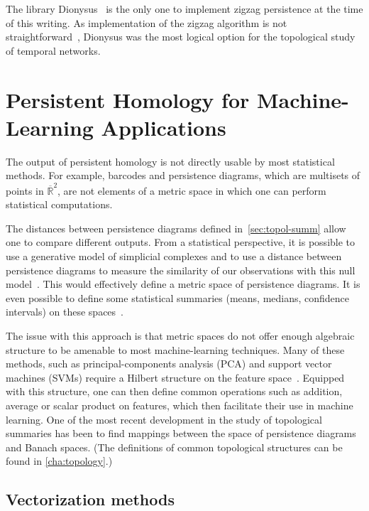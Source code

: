 \documentclass[a4paper,11pt,openany,extrafontsizes]{memoir}
\begin{document}
The library Dionysus~\cite{morozov_dionysus:_2018} is the only one to
implement zigzag persistence at the time of this writing. As
implementation of the zigzag algorithm is not
straightforward~\cite{carlsson_zigzag_2009, maria_computing_2016},
Dionysus was the most logical option for the topological study of
temporal networks.

\chapter{Persistent Homology for Machine-Learning Applications}%
\label{cha:pers-homol-mach}

The output of persistent homology is not directly usable by most
statistical methods. For example, barcodes and persistence diagrams,
which are multisets of points in $\overline{\mathbb{R}}^2$, are not
elements of a metric space in which one can perform statistical
computations.

The distances between persistence diagrams defined
in~\autoref{sec:topol-summ} allow one to compare different
outputs. From a statistical perspective, it is possible to use a
generative model of simplicial complexes and to use a distance between
persistence diagrams to measure the similarity of our observations
with this null model~\cite{adler_persistent_2010}. This would
effectively define a metric space of persistence diagrams. It is even
possible to define some statistical summaries (means, medians,
confidence intervals) on these
spaces~\cite{turner_frechet_2014,munch_probabilistic_2015}.

The issue with this approach is that metric spaces do not offer enough
algebraic structure to be amenable to most machine-learning
techniques. Many of these methods, such as principal-components
analysis (PCA) and support vector machines (SVMs) require a Hilbert
structure on the feature space~\cite{carriere_sliced_2017,
  chazal_persistence_2014}. Equipped with this structure, one can then
define common operations such as addition, average or scalar product
on features, which then facilitate their use in machine learning. One
of the most recent development in the study of topological summaries
has been to find mappings between the space of persistence diagrams
and Banach spaces\cite{adams_persistence_2017,
  bubenik_statistical_2015, kwitt_statistical_2015,
  kusano_kernel_2017}. (The definitions of common topological
structures can be found in \autoref{cha:topology}.)

\section{Vectorization methods}%
\label{sec:vect-meth}
\end{document}
